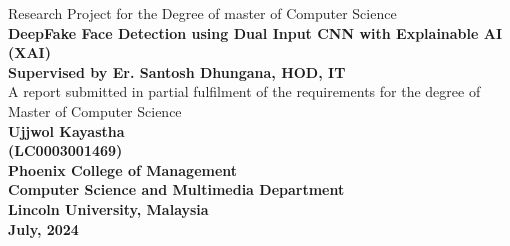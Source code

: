 \pagestyle{empty}
\begin{center}
    \Large{Research Project for the Degree of master of Computer Science}\\[31pt]

    \LARGE{\textbf{DeepFake Face Detection using Dual Input CNN with Explainable AI (XAI)}}\\[93pt]

    \Large{\textbf{Supervised by Er. Santosh Dhungana, HOD, IT }}\\[31pt]

    \Large{A report submitted in partial fulfilment of the requirements for the degree of Master of Computer Science}\\[93pt]

    \Large{\textbf{Ujjwol Kayastha \\ (LC0003001469)}}\\[31pt]

    \Large{\textbf{
            Phoenix College of Management \\
            Computer Science and Multimedia Department \\
            Lincoln University, Malaysia
        }}\\[31pt]

    \Large{\textbf{
            July, 2024
        }}\\[31pt]
\end{center}